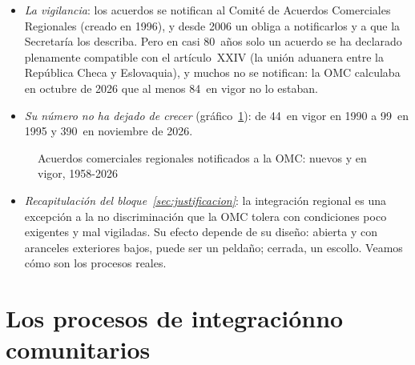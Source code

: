 \documentclass[11pt]{article}
\begin{document}
\begin{itemize}
\begin{itemize}
  \end{itemize}
\item \emph{La vigilancia}: los acuerdos se notifican al Comité de Acuerdos Comerciales Regionales (creado en 1996), y desde 2006 un  obliga a notificarlos y a que la Secretaría los describa\nocite{OMC2006Transparencia}. Pero en casi 80~años solo un acuerdo se ha declarado plenamente compatible con el artículo~XXIV (la unión aduanera entre la República Checa y Eslovaquia), y muchos no se notifican: la OMC calculaba en octubre de 2026 que al menos 84~en vigor no lo estaban\nocite{OMC2026ComiteACR}.
\item \emph{Su número no ha dejado de crecer} (gráfico~\ref{fig:acr}): de 44~en vigor en 1990 a 99~en 1995 y 390~en noviembre de 2026.
\end{itemize}

\begin{figure}[H]
\centering
\caption{Acuerdos comerciales regionales notificados a la OMC: nuevos y en vigor, 1958-2026}\label{fig:acr}
\end{figure}

\begin{itemize}
\item \emph{Recapitulación del bloque~\ref{sec:justificacion}}: la integración regional es una excepción a la no discriminación que la OMC tolera con condiciones poco exigentes y mal vigiladas. Su efecto depende de su diseño: abierta y con aranceles exteriores bajos, puede ser un peldaño; cerrada, un escollo. Veamos cómo son los procesos reales.
\end{itemize}

\section{Los procesos de integración\cortetitulo no comunitarios}\label{sec:procesos}
\end{document}
